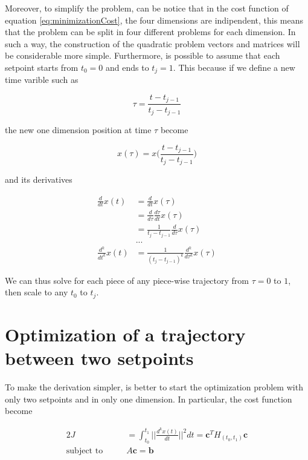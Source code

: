 \noindent Moreover, to simplify the problem, can be notice that in the cost function of equation \eqref{eq:minimizationCost}, the four dimensions are indipendent, this means that the problem can be split in four different problems for each dimension. In such a way, the construction of the quadratic problem vectors and matrices will be considerable more simple. Furthermore, is possible to assume that each setpoint starts from $t_0=0$ and ends to $t_j=1$. This because if we define a new time varible such as

\begin{equation}
	\tau = \frac{t-t_{j-1}}{t_j-t_{j-1}}
	\label{eq:simplyTime}
\end{equation}

\noindent the new one dimension position at time $\tau$ become

\begin{equation}
	x(\tau) = x\Big(\frac{t-t_{j-1}}{t_j-t_{j-1}}\Big)	
\end{equation}

\noindent and its derivatives

\begin{align*}
	\frac{d}{dt}x(t) &= \frac{d}{dt}x(\tau) \\
	&= \frac{d}{d\tau}\frac{d\tau}{dt}x(\tau) \\
	&= \frac{1}{t_j-t_{j-1}}\frac{d}{d\tau}x(\tau) \\
	&... \\
	\frac{d^k}{dt^k}x(t) &= \frac{1}{(t_j-t_{j-1})^k}\frac{d^k}{d\tau^k}x(\tau)
\end{align*}

\noindent We can thus solve for each piece of any piece-wise trajectory from $\tau=0$ to $1$, then scale to any $t_0$ to $t_j$.


\section{Optimization of a trajectory between two setpoints}

To make the derivation simpler, is better to start the optimization problem with only two setpoints and in only one dimension. In particular, the cost function become 

\begin{alignat}{2}
	J &= \int_{t_0}^{t_1}\Bigg|\Bigg|\frac{d^kx(t)}{dt}\Bigg|\Bigg|^2dt = \mathbf{c}^TH_{(t_0,t_1)}\mathbf{c} \\
	\text{subject to}\qquad & A\mathbf{c} = \mathbf{b} \nonumber
	\label{eq:oneSetpoint}
\end{alignat}

